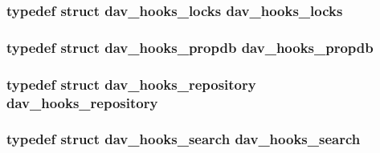 \subsubsection[{\texorpdfstring{dav\+\_\+hooks\+\_\+locks}{dav_hooks_locks}}]{\setlength{\rightskip}{0pt plus 5cm}typedef struct {\bf dav\+\_\+hooks\+\_\+locks} {\bf dav\+\_\+hooks\+\_\+locks}}\hypertarget{group__MOD__DAV_ga6693321785ea9339e16297428531d51d}{}\label{group__MOD__DAV_ga6693321785ea9339e16297428531d51d}
\subsubsection[{\texorpdfstring{dav\+\_\+hooks\+\_\+propdb}{dav_hooks_propdb}}]{\setlength{\rightskip}{0pt plus 5cm}typedef struct {\bf dav\+\_\+hooks\+\_\+propdb} {\bf dav\+\_\+hooks\+\_\+propdb}}\hypertarget{group__MOD__DAV_gae0928279f0bc1535e8858e02527ee015}{}\label{group__MOD__DAV_gae0928279f0bc1535e8858e02527ee015}
\subsubsection[{\texorpdfstring{dav\+\_\+hooks\+\_\+repository}{dav_hooks_repository}}]{\setlength{\rightskip}{0pt plus 5cm}typedef struct {\bf dav\+\_\+hooks\+\_\+repository} {\bf dav\+\_\+hooks\+\_\+repository}}\hypertarget{group__MOD__DAV_ga23c20415a7a56d3ca00265c673bf3f7a}{}\label{group__MOD__DAV_ga23c20415a7a56d3ca00265c673bf3f7a}
\subsubsection[{\texorpdfstring{dav\+\_\+hooks\+\_\+search}{dav_hooks_search}}]{\setlength{\rightskip}{0pt plus 5cm}typedef struct {\bf dav\+\_\+hooks\+\_\+search} {\bf dav\+\_\+hooks\+\_\+search}}\hypertarget{group__MOD__DAV_ga2506c1080f7dd94c91e54173fd51b586}{}\label{group__MOD__DAV_ga2506c1080f7dd94c91e54173fd51b586}

